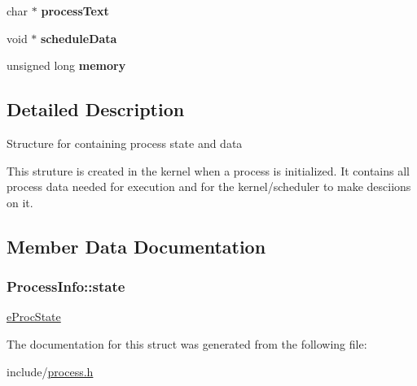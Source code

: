 \begin{DoxyCompactItemize}
\item 
\hypertarget{structProcessInfo_ae99b529cb79a446c0ff0d1a851b67fc5}{char $\ast$ {\bfseries process\-Text}}\label{dd/dc8/structProcessInfo_ae99b529cb79a446c0ff0d1a851b67fc5}

\item 
\hypertarget{structProcessInfo_aea1c50ae92f6421ae5c94ac674c1877a}{void $\ast$ {\bfseries schedule\-Data}}\label{dd/dc8/structProcessInfo_aea1c50ae92f6421ae5c94ac674c1877a}

\item 
\hypertarget{structProcessInfo_aa65ed051998c0493b68feeea5ae4955f}{unsigned long {\bfseries memory}}\label{dd/dc8/structProcessInfo_aa65ed051998c0493b68feeea5ae4955f}

\end{DoxyCompactItemize}


\subsection{\-Detailed \-Description}
\-Structure for containing process state and data

\-This struture is created in the kernel when a process is initialized. \-It contains all process data needed for execution and for the kernel/scheduler to make desciions on it. 

\subsection{\-Member \-Data \-Documentation}
\hypertarget{structProcessInfo_a748790bb8c3ef5d2dff552f35b81298e}{
\subsubsection[{state}]{ {\bf \-Process\-Info\-::state}}}\label{dd/dc8/structProcessInfo_a748790bb8c3ef5d2dff552f35b81298e}
\hyperlink{process_8h_a2c72cb00af5be695c1f898162350821f}{e\-Proc\-State} 

\-The documentation for this struct was generated from the following file\-:\begin{DoxyCompactItemize}
\item 
include/\hyperlink{process_8h}{process.\-h}\end{DoxyCompactItemize}
